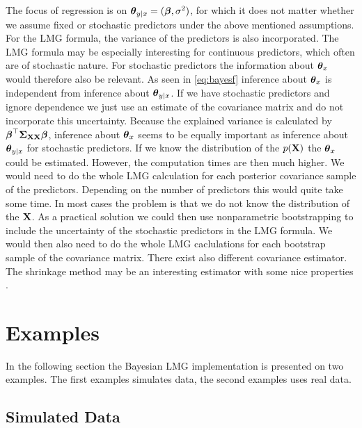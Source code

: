 \documentclass[11pt,a4paper,twoside]{book}\usepackage[]{graphicx}\usepackage[]{color}
\begin{document}
  The focus of regression is on ${\boldsymbol{\theta}}{}_{y \mid x} = ({\boldsymbol{\beta}}, \sigma^2)$, for which it does not matter whether we assume fixed or stochastic predictors under the above mentioned assumptions. For the LMG formula, the variance of the predictors is also incorporated. The LMG formula may be especially interesting for continuous predictors, which often are of stochastic nature. For stochastic predictors the information about ${\boldsymbol{\theta}}{}_{x}$ would therefore also be relevant.  As seen in \eqref{eq:bayesf} inference about ${\boldsymbol{\theta}}{}_{x}$  is independent from inference about ${\boldsymbol{\theta}}{}_{y \mid x}$. If we have stochastic predictors and ignore dependence we just use an estimate of the covariance matrix and do not incorporate this uncertainty.  Because the explained variance is calculated by ${\boldsymbol{\beta}}^\top {\boldsymbol{\Sigma}}{}_{{\mathbf{X}} {\mathbf{X}}}  {\boldsymbol{\beta}}$, inference about  ${\boldsymbol{\theta}}{}_{x}$  seems to be equally important as inference about ${\boldsymbol{\theta}}{}_{y \mid x}$ for stochastic predictors. If we know the distribution of the $p({\mathbf{X}})$ the ${\boldsymbol{\theta}}{}_{x}$ could be estimated. However, the computation times are then much higher. We would need to do the whole LMG calculation for each posterior covariance sample of the predictors. Depending on the number of predictors this would quite take some time.  In most cases the problem is that we do not know the distribution of the ${\mathbf{X}}$. As a practical solution we could then use nonparametric bootstrapping to include the uncertainty of the stochastic predictors in the LMG formula. We would then also need to do the whole LMG caclulations for each bootstrap sample of the covariance matrix. There exist also different covariance estimator. The shrinkage method may be an interesting estimator with some nice properties \citep{Schafer2005}. 
  
  
  
 









\chapter{Examples}

In the following section the Bayesian LMG implementation is presented on two examples. The first examples simulates data, the second examples uses real data.

\section{Simulated Data}
\end{document}
